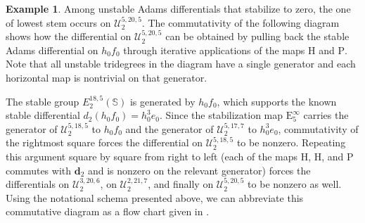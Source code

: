 \documentclass[dvipsnames,table]{amsart}
\theoremstyle{definition}
\newtheorem{example}[theorem]{Example}
\theoremstyle{remark}
\numberwithin{equation}{section}
\begin{document}
\begin{example}
\label{ex:simple}
Among unstable Adams differentials that stabilize to zero, the one of lowest
stem occurs on $\mathcal{U}_2^{5,20,5}$. The commutativity of the following diagram shows how the differential on $\mathcal{U}_2^{5, 20, 5}$ can be obtained by pulling back the stable Adams differential on $h_0 f_0$ through iterative applications of the maps $\mathrm{H}$ and $\mathrm{P}$. Note that all unstable tridegrees in the diagram have a single generator and each horizontal map is nontrivial on that generator.

\begin{center}
\end{center}

\noindent The stable group $E_2^{18,5}(\mathbb{S})$ is generated by $h_0 f_0$, which supports the known stable differential $d_2(h_0 f_0) = h_0^3 e_0$. Since the stabilization map $\mathrm{E}_5^\infty$ carries the generator of $\mathcal{U}_2^{5,18,5}$ to $h_0 f_0$ and the generator of $\mathcal{U}_2^{5,17,7}$ to $h_0^3 e_0$, commutativity of the rightmost square forces the differential on $\mathcal{U}_2^{5,18,5}$ to be nonzero. Repeating this argument square by square from right to left (each of the maps $\mathrm{H}$, $\mathrm{H}$, and $\mathrm{P}$ commutes with $\mathbf{d}_2$ and is nonzero on the relevant generator) forces the differentials on $\mathcal{U}_2^{3,20,6}$, on $\mathcal{U}_2^{2,21,7}$, and finally on $\mathcal{U}_2^{5,20,5}$ to be nonzero as well. Using the notational schema presented above, we can abbreviate this commutative diagram as a flow chart given in .


\end{example}
\end{document}
